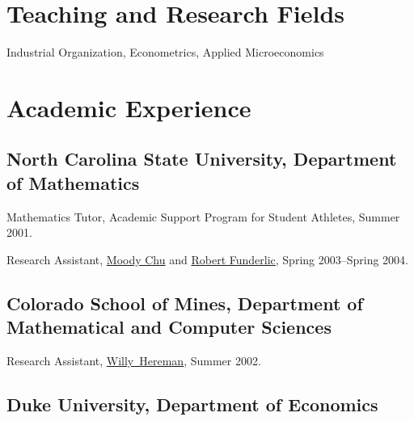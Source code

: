 \documentclass[letterpaper]{article}
\renewenvironment{itemize}{
  \begin{list}{}{
    \setlength{\leftmargin}{1em}
  }
}{
  \end{list}
}
\begin{document}
\section*{Teaching and Research Fields}

Industrial Organization, Econometrics, Applied Microeconomics


\section*{Academic Experience}

\subsection*{North Carolina State University,
  Department of Mathematics}

\begin{itemize}
\item Mathematics Tutor, Academic Support Program for Student Athletes,
  Summer 2001.
\item Research Assistant,
  \href{http://www4.ncsu.edu/~mtchu/}{Moody Chu} and
  \href{http://www4.ncsu.edu/~ref/}{Robert Funderlic},
  Spring 2003--Spring 2004.
\end{itemize}

\subsection*{Colorado School of Mines,
  Department of Mathematical and Computer Sciences}

\begin{itemize}
\item Research Assistant,
  \href{http://www.mines.edu/fs_home/whereman/}{Willy\ Hereman},
  Summer 2002.
\end{itemize}

\subsection*{Duke University, Department of Economics}
\end{document}
